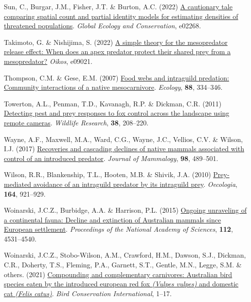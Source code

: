 \documentclass[preprint, 3p, authoryear]{elsarticle} %
\newlength{\cslhangindent}
\newlength{\cslentryspacingunit} %
\newenvironment{CSLReferences}[2] %
 {%
  \setlength{\parindent}{0pt}
  \ifodd #1
  \let\oldpar\par
  \def\par{\hangindent=\cslhangindent\oldpar}
  \fi
  \setlength{\parskip}{#2\cslentryspacingunit}
 }%
 {}
\begin{document}
\begin{CSLReferences}{1}{0}
\leavevmode{}%
Sun, C., Burgar, J.M., Fisher, J.T. \& Burton, A.C. (2022) \href{https://doi.org/10.1016/j.gecco.2022.e02268}{A cautionary tale comparing spatial count and partial identity models for estimating densities of threatened populations}. \emph{Global Ecology and Conservation}, e02268.

\leavevmode{}%
Takimoto, G. \& Nishijima, S. (2022) \href{\%20https://doi.org/10.1111/oik.09021}{A simple theory for the mesopredator release effect: When does an apex predator protect their shared prey from a mesopredator?} \emph{Oikos}, e09021.

\leavevmode{}%
Thompson, C.M. \& Gese, E.M. (2007) \href{https://doi.org/10.1890/0012-9658(2007)88\%5B334:FWAIPC\%5D2.0.CO;2}{Food webs and intraguild predation: Community interactions of a native mesocarnivore}. \emph{Ecology}, \textbf{88}, 334--346.

\leavevmode{}%
Towerton, A.L., Penman, T.D., Kavanagh, R.P. \& Dickman, C.R. (2011) \href{https://doi.org/10.1071/WR10213}{Detecting pest and prey responses to fox control across the landscape using remote cameras}. \emph{Wildlife Research}, \textbf{38}, 208--220.

\leavevmode{}%
Wayne, A.F., Maxwell, M.A., Ward, C.G., Wayne, J.C., Vellios, C.V. \& Wilson, I.J. (2017) \href{https://doi.org/10.1093/jmammal/gyw237}{{Recoveries and cascading declines of native mammals associated with control of an introduced predator}}. \emph{Journal of Mammalogy}, \textbf{98}, 489--501.

\leavevmode{}%
Wilson, R.R., Blankenship, T.L., Hooten, M.B. \& Shivik, J.A. (2010) \href{https://doi.org/10.1007/s00442-010-1797-8}{Prey-mediated avoidance of an intraguild predator by its intraguild prey}. \emph{Oecologia}, \textbf{164}, 921--929.

\leavevmode{}%
Woinarski, J.C.Z., Burbidge, A.A. \& Harrison, P.L. (2015) \href{https://doi.org/10.1073/pnas.1417301112}{Ongoing unraveling of a continental fauna: Decline and extinction of {{A}ustralian} mammals since {European} settlement}. \emph{Proceedings of the National Academy of Sciences}, \textbf{112}, 4531--4540.

\leavevmode{}%
Woinarski, J.C.Z., Stobo-Wilson, A.M., Crawford, H.M., Dawson, S.J., Dickman, C.R., Doherty, T.S., Fleming, P.A., Garnett, S.T., Gentle, M.N., Legge, S.M. \& others. (2021) \href{https://doi.org/10.1017/S0959270921000460}{Compounding and complementary carnivores: {A}ustralian bird species eaten by the introduced european red fox \emph{({Vulpes vulpes})} and domestic cat \emph{({Felis catus})}}. \emph{Bird Conservation International}, 1--17.


\end{CSLReferences}
\end{document}
